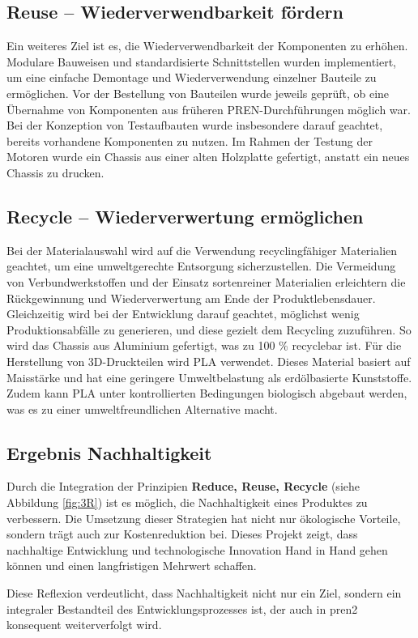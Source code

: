\documentclass[../main.tex]{subfiles}
\begin{document}
\newpage
\subsection{Reuse – Wiederverwendbarkeit fördern}

Ein weiteres Ziel ist es, die Wiederverwendbarkeit der Komponenten zu erhöhen. Modulare Bauweisen und standardisierte Schnittstellen wurden implementiert, um eine einfache Demontage und Wiederverwendung einzelner Bauteile zu ermöglichen. Vor der Bestellung von Bauteilen wurde jeweils geprüft, ob eine Übernahme von Komponenten aus früheren PREN-Durchführungen möglich war. Bei der Konzeption von Testaufbauten wurde insbesondere darauf geachtet, bereits vorhandene Komponenten zu nutzen. Im Rahmen der Testung der Motoren wurde ein Chassis aus einer alten Holzplatte gefertigt, anstatt ein neues Chassis zu drucken.

\subsection{Recycle – Wiederverwertung ermöglichen}

Bei der Materialauswahl wird auf die Verwendung recyclingfähiger Materialien geachtet, um eine umweltgerechte Entsorgung sicherzustellen. Die Vermeidung von Verbundwerkstoffen und der Einsatz sortenreiner Materialien erleichtern die Rückgewinnung und Wiederverwertung am Ende der Produktlebensdauer. Gleichzeitig wird bei der Entwicklung darauf geachtet, möglichst wenig Produktionsabfälle zu generieren, und diese gezielt dem Recycling zuzuführen. So wird das Chassis aus Aluminium gefertigt, was zu 100 \% recyclebar ist. Für die Herstellung von 3D-Druckteilen wird \gls{PLA} verwendet. Dieses Material basiert auf Maisstärke und hat eine geringere Umweltbelastung als erdölbasierte Kunststoffe. Zudem kann PLA unter kontrollierten Bedingungen biologisch abgebaut werden, was es zu einer umweltfreundlichen Alternative macht.

\subsection{Ergebnis Nachhaltigkeit}

Durch die Integration der Prinzipien \textbf{Reduce, Reuse, Recycle} (siehe Abbildung \ref{fig:3R}) ist es möglich, die Nachhaltigkeit eines Produktes zu verbessern. Die Umsetzung dieser Strategien hat nicht nur ökologische Vorteile, sondern trägt auch zur Kostenreduktion bei. Dieses Projekt zeigt, dass nachhaltige Entwicklung und technologische Innovation Hand in Hand gehen können und einen langfristigen Mehrwert schaffen.

Diese Reflexion verdeutlicht, dass Nachhaltigkeit nicht nur ein Ziel, sondern ein integraler Bestandteil des Entwicklungsprozesses ist, der auch in \acrshort{pren2} konsequent weiterverfolgt wird.
\end{document}
